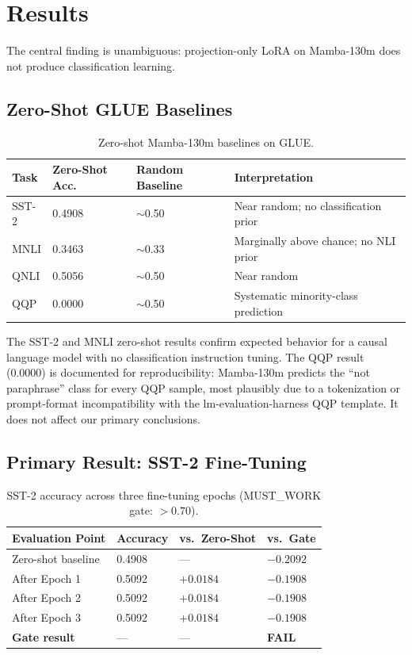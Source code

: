 \section{Results}
\label{sec:results}

The central finding is unambiguous: projection-only LoRA on Mamba-130m does not produce classification learning.

\subsection{Zero-Shot GLUE Baselines}

\begin{table}[h]
\centering
\caption{Zero-shot Mamba-130m baselines on GLUE.}
\label{tab:zeroshot}
\begin{tabular}{@{}llll@{}}
\toprule
\textbf{Task} & \textbf{Zero-Shot Acc.} & \textbf{Random Baseline} & \textbf{Interpretation} \\
\midrule
SST-2 & 0.4908 & $\sim$0.50 & Near random; no classification prior \\
MNLI  & 0.3463 & $\sim$0.33 & Marginally above chance; no NLI prior \\
QNLI  & 0.5056 & $\sim$0.50 & Near random \\
QQP   & 0.0000 & $\sim$0.50 & Systematic minority-class prediction \\
\bottomrule
\end{tabular}
\end{table}

The SST-2 and MNLI zero-shot results confirm expected behavior for a causal language model with no classification instruction tuning. The QQP result (0.0000) is documented for reproducibility: Mamba-130m predicts the ``not paraphrase'' class for every QQP sample, most plausibly due to a tokenization or prompt-format incompatibility with the lm-evaluation-harness QQP template. It does not affect our primary conclusions.

\subsection{Primary Result: SST-2 Fine-Tuning}

\begin{table}[h]
\centering
\caption{SST-2 accuracy across three fine-tuning epochs (MUST\_WORK gate: $> 0.70$).}
\label{tab:sst2}
\begin{tabular}{@{}llll@{}}
\toprule
\textbf{Evaluation Point} & \textbf{Accuracy} & \textbf{vs.\ Zero-Shot} & \textbf{vs.\ Gate} \\
\midrule
Zero-shot baseline & 0.4908 & --- & $-0.2092$ \\
After Epoch 1 & 0.5092 & $+0.0184$ & $-0.1908$ \\
After Epoch 2 & 0.5092 & $+0.0184$ & $-0.1908$ \\
After Epoch 3 & 0.5092 & $+0.0184$ & $-0.1908$ \\
\textbf{Gate result} & --- & --- & \textbf{FAIL} \\
\bottomrule
\end{tabular}
\end{table}

